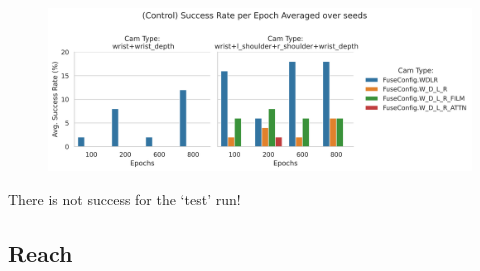 \begin{figure}[H]
  \centering
  \includegraphics[width=\linewidth]{assets/evaluation/derivatives/grasp-normal-control-success-cams.png}
  \caption{}\label{fig:}
\end{figure}

There is not success for the `test' run!

\subsection{Reach}